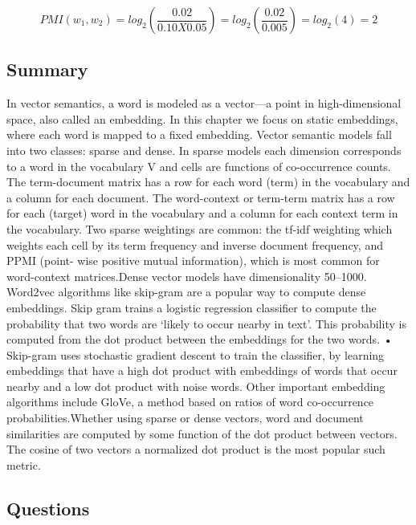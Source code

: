 \documentclass{article}
\begin{document}
\[
    PMI(w_1,w_2) = log_2(\frac{0.02}{0.10 X 0.05}) = log_2(\frac{0.02}{0.005}) = log_2(4) = 2
\]


\subsection{Summary}

In vector semantics, a word is modeled as a vector—a point in high-dimensional
space, also called an embedding. In this chapter we focus on static embeddings, where each word is mapped to a fixed embedding.
Vector semantic models fall into two classes: sparse and dense. In sparse
models each dimension corresponds to a word in the vocabulary V and cells
are functions of co-occurrence counts. The term-document matrix has a
row for each word (term) in the vocabulary and a column for each document.
The word-context or term-term matrix has a row for each (target) word in
the vocabulary and a column for each context term in the vocabulary. Two
sparse weightings are common: the tf-idf weighting which weights each cell
by its term frequency and inverse document frequency, and PPMI (point-
wise positive mutual information), which is most common for word-context
matrices.Dense vector models have dimensionality 50–1000. Word2vec algorithms
like skip-gram are a popular way to compute dense embeddings. Skip gram
trains a logistic regression classifier to compute the probability that two words
are ‘likely to occur nearby in text’. This probability is computed from the dot
product between the embeddings for the two words.
• Skip-gram uses stochastic gradient descent to train the classifier, by learning
embeddings that have a high dot product with embeddings of words that occur
nearby and a low dot product with noise words. Other important embedding algorithms include GloVe, a method based on
ratios of word co-occurrence probabilities.Whether using sparse or dense vectors, word and document similarities are
computed by some function of the dot product between vectors. The cosine
of two vectors a normalized dot product is the most popular such metric.

\subsection{Questions}
\end{document}
